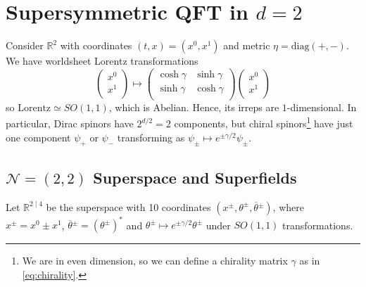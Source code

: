 
\chapter{Supersymmetric QFT in \texorpdfstring{$d = 2$}{Two Dimensions}}%
\label{cha:susy_qft_in_two_dimensions}

Consider $\mathbb{R}^2$ with coordinates $(t, x) = (x^0, x^1)$ and metric $\eta = \text{diag}(+, -)$.
We have worldsheet Lorentz transformations
\begin{equation}
  \begin{pmatrix}
  x^0 \\
  x^1 \\
  \end{pmatrix} \mapsto
  \begin{pmatrix}
   \cosh\gamma & \sinh \gamma \\
   \sinh \gamma & \cosh \gamma \\
  \end{pmatrix}
  \begin{pmatrix}
  x^0 \\
  x^1 \\
  \end{pmatrix}
\end{equation}
so $\text{Lorentz} \simeq SO(1, 1)$, which is Abelian.
Hence, its irreps are $1$-dimensional. In particular, Dirac spinors have $2^{d / 2} = 2$ components, but chiral spinors\footnote{We are in even dimension, so we can define a chirality matrix $\gamma$ as in \eqref{eq:chirality}.} have just one component $\psi_+$ or $\psi_-$ transforming as $\psi_{\pm} \mapsto e^{\pm \gamma / 2} \psi_{\pm}$.

\section{\texorpdfstring{$\mathcal{N} = (2, 2)$}{2, 2} Superspace and Superfields}%
\label{sec:2_2_superspace}

Let $\mathbb{R}^{2 \mid 4}$ be the superspace with 10 coordinates $(x^{\pm}, \theta^{\pm}, \overline{\theta}{}^{\pm})$, where $x^{\pm} =  x^0 \pm x^1$, $\overline{\theta}{}^{\pm} = (\theta^{\pm})^*$ and $\theta^{\pm} \mapsto e^{\pm \gamma / 2} \theta^{\pm}$ under $SO(1, 1)$ transformations.

